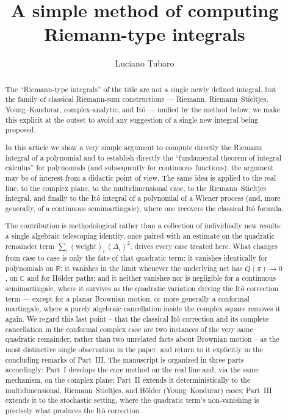 \documentclass[11pt,fleqn]{article}
\author{Luciano Tubaro\\
}
\title{A simple method of computing Riemann-type integrals}
\date{}
\def\C{\mathbb C}
\def\R{\mathbb R}
\theoremstyle{plain}
\theoremstyle{remark}
\begin{document}
\sloppy
\maketitle

\begin{abstract}
The ``Riemann-type integrals'' of the title are not a single newly
defined integral, but the family of classical Riemann-sum constructions
--- Riemann, Riemann--Stieltjes, Young--Kondurar, complex-analytic, and
It\^o --- unified by the method below; we make this explicit at the
outset to avoid any suggestion of a single new integral being proposed.

In this article we show a very simple argument to compute directly the
Riemann integral of a polynomial and to establish directly the
``fundamental theorem of integral calculus'' for polynomials (and
subsequently for continuous functions); the argument may be of interest
from a didactic point of view. The same idea is applied to the real
line, to the complex plane, to the multidimensional case, to the
Riemann--Stieltjes integral, and finally to the It\^o integral of a
polynomial of a Wiener process (and, more generally, of a continuous
semimartingale), where one recovers the classical It\^o formula.

The contribution is methodological rather than a collection of
individually new results: a single algebraic telescoping identity, once
paired with an estimate on the quadratic remainder term
$\sum_i(\text{weight})_i\,(\Delta_i)^2$, drives every case treated here.
What changes from case to case is only the fate of that quadratic term:
it vanishes identically for polynomials on $\R$; it vanishes in the
limit whenever the underlying net has $Q(\pi)\to0$, on $\C$ and for
H\"older paths; and it neither vanishes nor is negligible for a
continuous semimartingale, where it survives as the quadratic variation
driving the It\^o correction term --- except for a planar Brownian
motion, or more generally a conformal martingale, where a purely
algebraic cancellation inside the complex square removes it again. We
regard this last point -- that the classical It\^o correction and its
complete cancellation in the conformal complex case are two instances of
the very same quadratic remainder, rather than two unrelated facts about
Brownian motion -- as the most distinctive single observation in the
paper, and return to it explicitly in the concluding remarks of
Part~III. The manuscript is organized in three parts accordingly:
Part~I develops the
core method on the real line and, via the same mechanism, on the complex
plane; Part~II extends it deterministically to the multidimensional,
Riemann--Stieltjes, and H\"older (Young--Kondurar) cases; Part~III
extends it to the stochastic setting, where the quadratic term's
non-vanishing is precisely what produces the It\^o correction.
\end{abstract}
\end{document}
